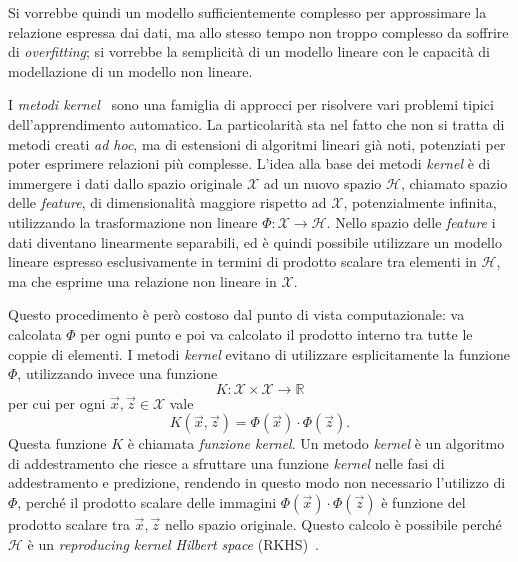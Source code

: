 Si vorrebbe quindi un modello sufficientemente complesso per approssimare la relazione espressa dai dati, ma allo stesso tempo non troppo complesso da soffrire di \emph{overfitting}; si vorrebbe la semplicità di un modello lineare con le capacità di modellazione di un modello non lineare. 

I \emph{metodi kernel}~\cite{2007_kernel_methods} sono una famiglia di approcci per risolvere vari problemi tipici dell'apprendimento automatico. La particolarità sta nel fatto che non si tratta di metodi creati \emph{ad hoc}, ma di estensioni di algoritmi lineari già noti, potenziati per poter esprimere relazioni più complesse.
L'idea alla base dei metodi \emph{kernel} è di immergere i dati dallo spazio originale $\mathcal{X}$ ad un nuovo spazio $\mathcal{H}$, chiamato spazio delle \emph{feature}, di dimensionalità maggiore rispetto ad $\mathcal{X}$, potenzialmente infinita, utilizzando la trasformazione non lineare $\Phi: \mathcal{X} \rightarrow \mathcal{H}$.
Nello spazio delle \emph{feature} i dati diventano linearmente separabili, ed è quindi possibile utilizzare un modello lineare espresso esclusivamente in termini di prodotto scalare tra elementi in $\mathcal{H}$, ma che esprime una relazione non lineare in $\mathcal{X}$.

Questo procedimento è però costoso dal punto di vista computazionale: va calcolata $\Phi$ per ogni punto e poi va calcolato il prodotto interno tra tutte le coppie di elementi.
I metodi \emph{kernel} evitano di utilizzare esplicitamente la funzione $\Phi$, utilizzando invece una funzione
\begin{equation*}
    K: \mathcal{X} \times \mathcal{X} \rightarrow \mathbb{R} 
\end{equation*}
per cui per ogni $\Vec{x}, \Vec{z} \in \mathcal{X}$ vale
\begin{equation*}
    K(\Vec{x}, \Vec{z}) = \Phi(\Vec{x}) \cdot \Phi(\Vec{z}).
\end{equation*}
Questa funzione $K$ è chiamata \emph{funzione kernel}.
Un metodo \emph{kernel} è un algoritmo di addestramento che riesce a sfruttare una funzione \emph{kernel} nelle fasi di addestramento e predizione, rendendo in questo modo non necessario l'utilizzo di $\Phi$, perché il prodotto scalare delle immagini $\Phi(\Vec{x}) \cdot \Phi(\Vec{z})$ è funzione del prodotto scalare tra $\Vec{x}, \Vec{z}$ nello spazio originale.
Questo calcolo è possibile perché $\mathcal{H}$ è un \emph{reproducing kernel Hilbert space} (RKHS)~\cite{RKHS}.

